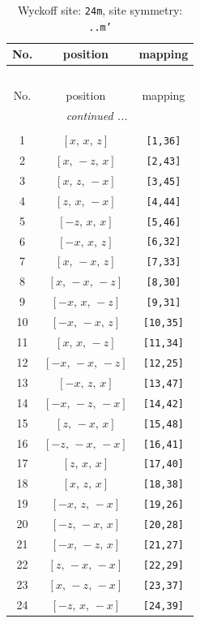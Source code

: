 \documentclass[fleqn,8pt]{jsarticle}
\begin{document}
\renewcommand{\arraystretch}{1.2}
\begin{longtable}{ccc}
\caption{Wyckoff site: {\tt 24m}, site symmetry: {\tt ..m'}}
 \\
 \hline \hline
No. & position & mapping \\ \hline \endfirsthead

\multicolumn{2}{l}{\tablename\ \thetable{}} \\
 \hline \hline
No. & position & mapping \\ \hline \endhead

 \hline \hline
\multicolumn{2}{r}{\footnotesize\it continued ...} \\ \endfoot

 \hline \hline
\multicolumn{2}{r}{} \\ \endlastfoot

1 & $\left[ x,\, x,\, z \right]$ & {\tt [1,36]} \\ \hline
2 & $\left[ x,\, - z,\, x \right]$ & {\tt [2,43]} \\ \hline
3 & $\left[ x,\, z,\, - x \right]$ & {\tt [3,45]} \\ \hline
4 & $\left[ z,\, x,\, - x \right]$ & {\tt [4,44]} \\ \hline
5 & $\left[ - z,\, x,\, x \right]$ & {\tt [5,46]} \\ \hline
6 & $\left[ - x,\, x,\, z \right]$ & {\tt [6,32]} \\ \hline
7 & $\left[ x,\, - x,\, z \right]$ & {\tt [7,33]} \\ \hline
8 & $\left[ x,\, - x,\, - z \right]$ & {\tt [8,30]} \\ \hline
9 & $\left[ - x,\, x,\, - z \right]$ & {\tt [9,31]} \\ \hline
10 & $\left[ - x,\, - x,\, z \right]$ & {\tt [10,35]} \\ \hline
11 & $\left[ x,\, x,\, - z \right]$ & {\tt [11,34]} \\ \hline
12 & $\left[ - x,\, - x,\, - z \right]$ & {\tt [12,25]} \\ \hline
13 & $\left[ - x,\, z,\, x \right]$ & {\tt [13,47]} \\ \hline
14 & $\left[ - x,\, - z,\, - x \right]$ & {\tt [14,42]} \\ \hline
15 & $\left[ z,\, - x,\, x \right]$ & {\tt [15,48]} \\ \hline
16 & $\left[ - z,\, - x,\, - x \right]$ & {\tt [16,41]} \\ \hline
17 & $\left[ z,\, x,\, x \right]$ & {\tt [17,40]} \\ \hline
18 & $\left[ x,\, z,\, x \right]$ & {\tt [18,38]} \\ \hline
19 & $\left[ - x,\, z,\, - x \right]$ & {\tt [19,26]} \\ \hline
20 & $\left[ - z,\, - x,\, x \right]$ & {\tt [20,28]} \\ \hline
21 & $\left[ - x,\, - z,\, x \right]$ & {\tt [21,27]} \\ \hline
22 & $\left[ z,\, - x,\, - x \right]$ & {\tt [22,29]} \\ \hline
23 & $\left[ x,\, - z,\, - x \right]$ & {\tt [23,37]} \\ \hline
24 & $\left[ - z,\, x,\, - x \right]$ & {\tt [24,39]} \\
\end{longtable}
\end{document}
